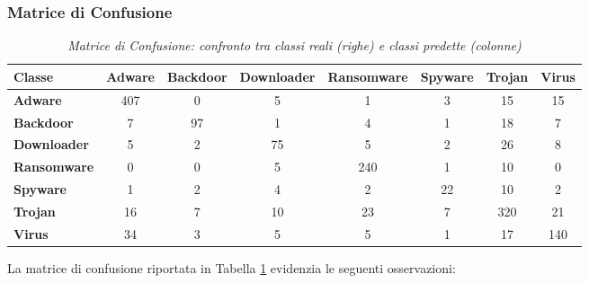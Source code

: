 \subsubsection{Matrice di Confusione}
\begin{table}[ht]
    \centering
    \hspace*{-2cm} 
    \begin{tabular}{@{}|l|c|c|c|c|c|c|c|@{}}
    \toprule
    \textbf{Classe}      & \textbf{Adware} & \textbf{Backdoor} & \textbf{Downloader} & \textbf{Ransomware} & \textbf{Spyware} & \textbf{Trojan} & \textbf{Virus} \\ \midrule
    \textbf{Adware}      & 407 & 0   & 5   & 1   & 3   & 15  & 15  \\\midrule
    \textbf{Backdoor}    & 7   & 97  & 1   & 4   & 1   & 18  & 7   \\\midrule
    \textbf{Downloader}  & 5   & 2   & 75  & 5   & 2   & 26  & 8   \\\midrule
    \textbf{Ransomware}  & 0   & 0   & 5   & 240 & 1   & 10  & 0   \\\midrule
    \textbf{Spyware}     & 1   & 2   & 4   & 2   & 22  & 10  & 2   \\\midrule
    \textbf{Trojan}      & 16  & 7   & 10  & 23  & 7   & 320 & 21  \\\midrule
    \textbf{Virus}       & 34  & 3   & 5   & 5   & 1   & 17  & 140 \\ \bottomrule
    \end{tabular}
    \vspace{.2cm}
    \caption{\emph{Matrice di Confusione: confronto tra classi reali (righe) e classi predette (colonne)}}
    \label{tab:confusion_matrix_2_esperimento}
\end{table}
La matrice di confusione riportata in Tabella \ref{tab:confusion_matrix_2_esperimento} evidenzia le seguenti osservazioni:
